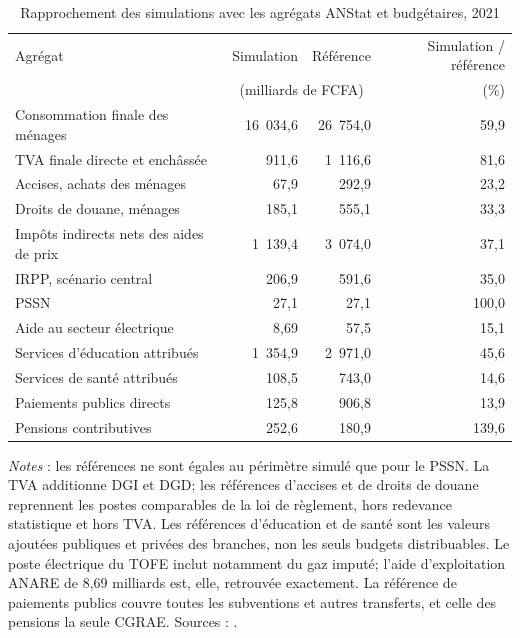 \documentclass[11pt,a4paper]{article}
\begin{document}
\begin{table}[t]
\centering
\begin{threeparttable}
\caption{Rapprochement des simulations avec les agrégats ANStat et budgétaires, 2021}
\label{tab:macro-validation}
\small
\begin{tabular}{lrrr}
\toprule
Agrégat & Simulation & Référence & Simulation / référence \\
        & \multicolumn{2}{c}{(milliards de FCFA)} & (\%) \\
\midrule
Consommation finale des ménages  & 16~034,6 & 26~754,0 & 59,9 \\
TVA finale directe et enchâssée &    911,6 &  1~116,6 & 81,6 \\
Accises, achats des ménages      &     67,9 &    292,9 & 23,2 \\
Droits de douane, ménages        &    185,1 &    555,1 & 33,3 \\
Impôts indirects nets des aides de prix & 1~139,4 & 3~074,0 & 37,1 \\
IRPP, scénario central           &    206,9 &    591,6 & 35,0 \\
PSSN                             &     27,1 &     27,1 & 100,0 \\
Aide au secteur électrique       &      8,69&     57,5 & 15,1 \\
Services d'éducation attribués   &  1~354,9 &  2~971,0 & 45,6 \\
Services de santé attribués      &    108,5 &    743,0 & 14,6 \\
Paiements publics directs        &    125,8 &    906,8 & 13,9 \\
Pensions contributives          &    252,6 &    180,9 & 139,6 \\
\bottomrule
\end{tabular}
\begin{tablenotes}\footnotesize
\item \emph{Notes} : les références ne sont égales au périmètre simulé que
pour le PSSN. La TVA additionne DGI et DGD; les références d'accises et de droits de
douane reprennent les postes comparables de la loi de règlement, hors redevance
statistique et hors TVA. Les références d'éducation et de santé sont les valeurs ajoutées
publiques et privées des branches, non les seuls budgets distribuables. Le poste
électrique du TOFE inclut notamment du gaz imputé; l'aide d'exploitation ANARE
de 8,69 milliards est, elle, retrouvée exactement. La référence de paiements
publics couvre toutes les subventions et autres transferts, et celle des pensions
la seule CGRAE. Sources : \citet{anstat2023,anstatcna2023,anare2021,civreglement2021,civperformance2021}.
\end{tablenotes}
\end{threeparttable}
\end{table}
\end{document}
